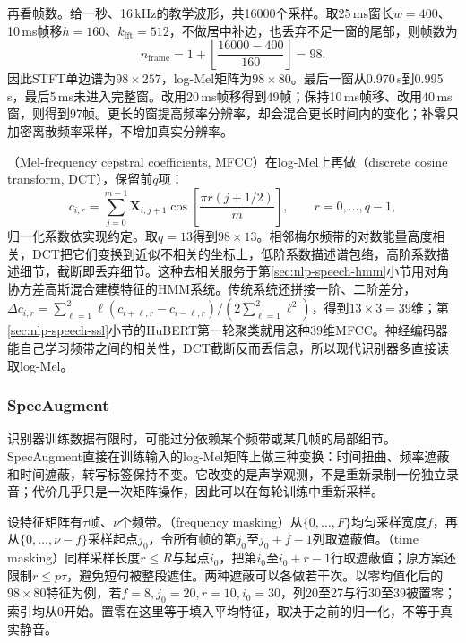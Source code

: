 再看帧数。给一秒、16\,kHz的教学波形，共16000个采样。取25\,ms窗长$w=400$、10\,ms帧移$h=160$、$k_{\mathrm{fft}}=512$，不做居中补边，也丢弃不足一窗的尾部，则帧数为
\begin{equation}
 n_{\mathrm{frame}}=
 1+\left\lfloor\frac{16000-400}{160}\right\rfloor=98.
 \label{eq:nlp-speech-frame-count}
\end{equation}
因此STFT单边谱为$98\times257$，log-Mel矩阵为$98\times80$。最后一窗从0.970\,s到0.995\,s，最后5\,ms未进入完整窗。改用20\,ms帧移得到49帧；保持10\,ms帧移、改用40\,ms窗，则得到97帧。更长的窗提高频率分辨率，却会混合更长时间内的变化；补零只加密离散频率采样，不增加真实分辨率。

（Mel-frequency cepstral coefficients, MFCC）在log-Mel上再做（discrete cosine transform, DCT），保留前$q$项：
\begin{equation}
 c_{i,r}=\sum_{j=0}^{m-1}\bm{X}_{i,j+1}\cos\!\left[\frac{\pi r(j+1/2)}{m}\right],
 \qquad r=0,\ldots,q-1,
 \label{eq:nlp-speech-mfcc}
\end{equation}
归一化系数依实现约定。取$q=13$得到$98\times13$。相邻梅尔频带的对数能量高度相关，DCT把它们变换到近似不相关的坐标上，低阶系数描述谱包络，高阶系数描述细节，截断即丢弃细节。这种去相关服务于第\ref{sec:nlp-speech-hmm}小节用对角协方差高斯混合建模特征的HMM系统。传统系统还拼接一阶、二阶差分，$\Delta c_{i,r}=\sum_{\ell=1}^{2}\ell(c_{i+\ell,r}-c_{i-\ell,r})/(2\sum_{\ell=1}^{2}\ell^2)$，得到$13\times3=39$维；第\ref{sec:nlp-speech-ssl}小节的HuBERT第一轮聚类就用这种39维MFCC。神经编码器能自己学习频带之间的相关性，DCT截断反而丢信息，所以现代识别器多直接读取log-Mel。

\subsubsection{SpecAugment}
\label{sec:nlp-speech-specaugment}

识别器训练数据有限时，可能过分依赖某个频带或某几帧的局部细节。SpecAugment直接在训练输入的log-Mel矩阵上做三种变换：时间扭曲、频率遮蔽和时间遮蔽，转写标签保持不变。它改变的是声学观测，不是重新录制一份独立录音；代价几乎只是一次矩阵操作，因此可以在每轮训练中重新采样。

设特征矩阵有$\tau$帧、$\nu$个频带。（frequency masking）从$\{0,\ldots,F\}$均匀采样宽度$f$，再从$\{0,\ldots,\nu-f\}$采样起点$j_0$，令所有帧的第$j_0$至$j_0+f-1$列取遮蔽值。（time masking）同样采样长度$r\leq R$与起点$i_0$，把第$i_0$至$i_0+r-1$行取遮蔽值；原方案还限制$r\leq p\tau$，避免短句被整段遮住。两种遮蔽可以各做若干次。以零均值化后的$98\times80$特征为例，若$f=8,j_0=20,r=10,i_0=30$，列20至27与行30至39被置零；索引均从0开始。置零在这里等于填入平均特征，取决于之前的归一化，不等于真实静音。

